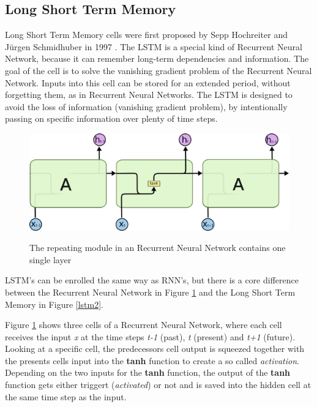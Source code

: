 \subsection{Long Short Term Memory}\label{ss:lstm}
Long Short Term Memory cells were first proposed by Sepp Hochreiter and Jürgen Schmidhuber in 1997 \cite{hochreiter1997long}. The LSTM is a special kind of Recurrent Neural Network, because it can remember long-term dependencies and information. The goal of the cell is to solve the vanishing gradient problem of the Recurrent Neural Network. Inputs into this cell can be stored for an extended period, without forgetting them, as in Recurrent Neural Networks. The LSTM is designed to avoid the loss of information (vanishing gradient problem), by intentionally passing on specific information over plenty of time steps. 

\begin{figure}
	\begin{center}
		\includegraphics[width=4.5in]{photos/LSTM3-SimpleRNN}\\
		\caption{The repeating module in an Recurrent Neural Network contains one single layer \cite{olah}}\label{lstm}
	\end{center}
\end{figure}

LSTM's can be enrolled the same way as RNN's, but there is a core difference between the Recurrent Neural Network in Figure \ref{lstm} and the Long Short Term Memory in Figure \ref{lstm2}. 

Figure \ref{lstm} shows three cells of a Recurrent Neural Network, where each cell receives the input \textit{x} at the time steps \textit{t-1} (past), \textit{t} (present) and \textit{t+1} (future).  Looking at a specific cell, the predecessors cell output is squeezed together with the presents cells input into the \textbf{tanh} function to create a so called \textit{activation}. Depending on the two inputs for the \textbf{tanh} function, the output of the \textbf{tanh} function gets either triggert (\textit{activated}) or not and is saved into the hidden cell at the same time step as the input.

